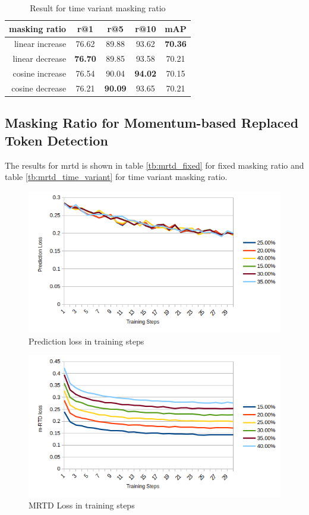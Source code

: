 \begin{table}[htbp]
  \centering
  \caption{Result for time variant masking ratio}
  \label{tb:time_variant_mlm}
  \begin{tabular}{rcccc}
    \centering
    masking ratio & r@1 & r@5 & r@10 & mAP\\ \hline
    linear increase & 76.62 & 89.88 & 93.62 & \textbf{70.36} \\
    linear decrease & \textbf{76.70} & 89.85 & 93.58 & 70.21 \\
    cosine increase & 76.54 & 90.04 & \textbf{94.02} & 70.15 \\
    cosine decrease & 76.21 & \textbf{90.09} & 93.65 & 70.21 \\
  \end{tabular}
\end{table}


\subsection{Masking Ratio for Momentum-based Replaced Token Detection}
The results for \acrshort{mrtd} is shown in table \ref{tb:mrtd_fixed} for fixed masking ratio and table \ref{tb:mrtd_time_variant} for time variant masking ratio. 

\begin{figure}
    \includegraphics[width=\linewidth]{img/mrtd_prd_loss.png}
    \caption{Prediction loss in training steps}
    \label{img:mrtd_prd_loss}
\end{figure}

\begin{figure}
    \includegraphics[width=\linewidth]{img/mrtd_loss.png}
    \caption{MRTD Loss in training steps}
    \label{img:mrtd_loss}
\end{figure}

